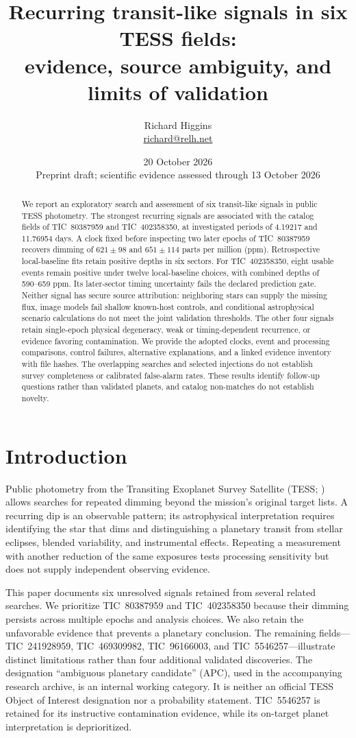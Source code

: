 \documentclass[11pt]{article}
\title{Recurring transit-like signals in six TESS fields:\\evidence, source ambiguity, and limits of validation}
\author{Richard Higgins\\\small\href{mailto:richard@relh.net}{richard@relh.net}}
\date{20 October 2026\\\small Preprint draft; scientific evidence assessed through 13 October 2026}
\begin{document}
\maketitle
\begin{abstract}
We report an exploratory search and assessment of six transit-like signals in public TESS photometry. The strongest recurring signals are associated with the catalog fields of TIC~80387959 and TIC~402358350, at investigated periods of 4.19217 and 11.76954 days. A clock fixed before inspecting two later epochs of TIC~80387959 recovers dimming of $621\pm98$ and $651\pm114$ parts per million (ppm). Retrospective local-baseline fits retain positive depths in six sectors. For TIC~402358350, eight usable events remain positive under twelve local-baseline choices, with combined depths of 590--659 ppm. Its later-sector timing uncertainty fails the declared prediction gate. Neither signal has secure source attribution: neighboring stars can supply the missing flux, image models fail shallow known-host controls, and conditional astrophysical scenario calculations do not meet the joint validation thresholds. The other four signals retain single-epoch physical degeneracy, weak or timing-dependent recurrence, or evidence favoring contamination. We provide the adopted clocks, event and processing comparisons, control failures, alternative explanations, and a linked evidence inventory with file hashes. The overlapping searches and selected injections do not establish survey completeness or calibrated false-alarm rates. These results identify follow-up questions rather than validated planets, and catalog non-matches do not establish novelty.
\end{abstract}

\section{Introduction}
Public photometry from the Transiting Exoplanet Survey Satellite (TESS; \citealt{ricker2015}) allows searches for repeated dimming beyond the mission's original target lists. A recurring dip is an observable pattern; its astrophysical interpretation requires identifying the star that dims and distinguishing a planetary transit from stellar eclipses, blended variability, and instrumental effects. Repeating a measurement with another reduction of the same exposures tests processing sensitivity but does not supply independent observing evidence.

This paper documents six unresolved signals retained from several related searches. We prioritize TIC~80387959 and TIC~402358350 because their dimming persists across multiple epochs and analysis choices. We also retain the unfavorable evidence that prevents a planetary conclusion. The remaining fields---TIC~241928959, TIC~469309982, TIC~96166003, and TIC~5546257---illustrate distinct limitations rather than four additional validated discoveries. The designation ``ambiguous planetary candidate'' (APC), used in the accompanying research archive, is an internal working category. It is neither an official TESS Object of Interest designation nor a probability statement. TIC~5546257 is retained for its instructive contamination evidence, while its on-target planet interpretation is deprioritized.
\end{document}

